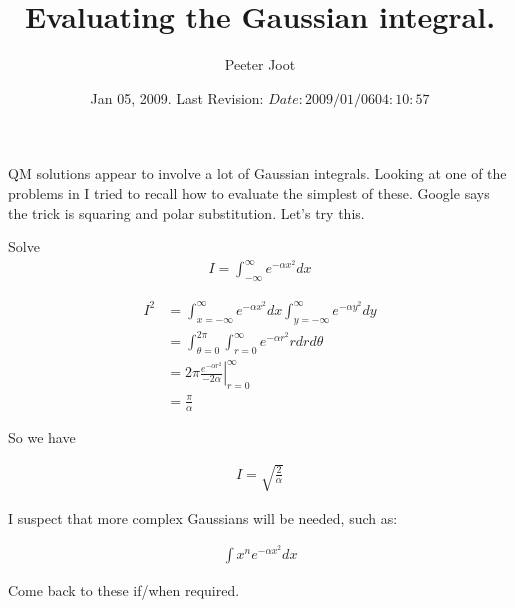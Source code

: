 \documentclass{article}
\title{ Evaluating the Gaussian integral. }
\author{Peeter Joot}
\date{ Jan 05, 2009.  Last Revision: $Date: 2009/01/06 04:10:57 $ }
\begin{document}
\maketitle{}

QM solutions appear to involve a lot of Gaussian integrals.  Looking at one
of the problems in \cite{mcmahon2005qmd} I tried to recall how to evaluate
the simplest of these.  Google says the trick is squaring and polar 
substitution.  Let's try this.

Solve
\begin{align*}
I = \int_{-\infty}^\infty e^{-\alpha x^2} dx
\end{align*}

\begin{align*}
I^2 
&= \int_{x= -\infty}^\infty e^{-\alpha x^2} dx \int_{y = -\infty}^\infty e^{-\alpha y^2} dy \\
&= \int_{\theta=0}^{2\pi}\int_{r= 0}^\infty e^{-\alpha r^2} r dr d\theta \\
&= 2\pi 
{\left.
\frac{e^{-\alpha r^2}}{-2\alpha}
\right\vert}_{r= 0}^\infty  \\
&= \frac{\pi}{\alpha}
\end{align*}

So we have

\begin{align*}
I = \sqrt{\frac{2}{\alpha}}
\end{align*}

I suspect that more complex Gaussians will be needed, such as:

\begin{align*}
\int x^n e^{-\alpha x^2} dx
\end{align*}

Come back to these if/when required.



\end{document}

